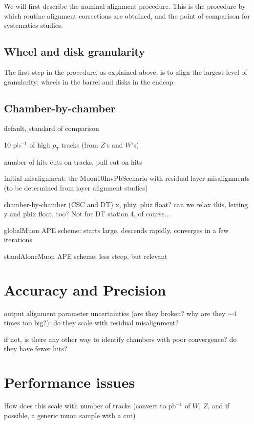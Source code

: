 \documentclass[12pt]{article}
\begin{document}
We will first describe the nominal alignment procedure.  This is the
procedure by which routine alignment corrections are obtained, and the
point of comparison for systematics studies.

\subsection{Wheel and disk granularity}

The first step in the procedure, as explained above, is to align the
largest level of granularity: wheels in the barrel and disks in the
endcap.

\subsection{Chamber-by-chamber}

default, standard of comparison

10 pb$^{-1}$ of high $p_T$ tracks (from $Z$'s and $W$'s)

number of hits cuts on tracks, pull cut on hits

Initial misalignment: the Muon10InvPbScenario with residual layer
misalignments (to be determined from layer alignment studies)

chamber-by-chamber (CSC and DT) x, phiy, phiz float?  can we relax
this, letting y and phix float, too?  Not for DT station 4, of course...

globalMuon APE scheme: starts large, descends rapidly, converges
in a few iterations

standAloneMuon APE scheme: less steep, but relevant

\section{Accuracy and Precision}

output alignment parameter uncertainties (are they broken?  why
are they $\sim$4 times too big?): do they scale with residual
misalignment?

if not, is there any other way to identify chambers with poor
convergence?  do they have fewer hits?

\section{Performance issues}

How does this scale with number of tracks (convert to pb$^{-1}$ of $W$,
$Z$, and if possible, a generic muon sample with a cut)
\end{document}
